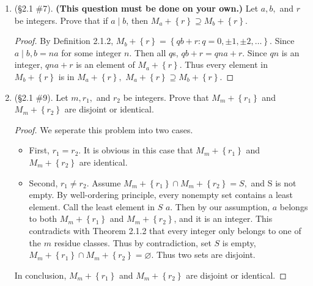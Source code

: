 \documentclass[11pt,a4paper]{article}
\begin{document}
\begin{enumerate}
	\item (\S 2.1 \#7).  \textbf{(This question must be done on your own.)} Let \(a, b,\) and \(r\) be integers. Prove that if \(a \mid b\), then \(M_{a}+\left\{ r\right\} \supseteq M_{b}+\left\{ r\right\}\).

	\begin{proof}
		By Definition 2.1.2, \(M_{b}+\left\{ r\right\} = \left\{ qb + r: q = 0, \pm 1, \pm 2, \ldots \right\}.\) Since $a \mid b, b = na$ for some integer $n.$ Then all $q$s, $qb+r = qna + r.$ Since $qn$ is an integer, $qna + r$ is an element of \(M_{a}+\left\{ r\right\}.\) Thus every element in \(M_{b}+\left\{ r\right\}\) is in \(M_{a}+\left\{ r\right\},\) \(M_{a}+\left\{ r\right\} \supseteq M_{b}+\left\{ r\right\}\).
	\end{proof}

	\item (\S 2.1 \#9). Let \(m, r_{1},\) and \(r_{2}\) be integers. Prove that \(M_{m}+\left\{r_{1}\right\}\) and \(M_{m}+\left\{r_{2}\right\}\) are disjoint or identical.

	\begin{proof} We seperate this problem into two cases.
		\begin{itemize}
			\item First, $r_1 = r_2.$ It is obvious in this case that \(M_{m}+\left\{r_{1}\right\}\) and \(M_{m}+\left\{r_{2}\right\}\) are identical.
			\item Second, $r_1 \ne r_2.$ Assume \(M_{m}+\left\{r_{1}\right\} \cap M_{m}+\left\{r_{2}\right\} = S,\) and S is not empty. By well-ordering principle, every nonempty set contains a least element. Call the least element in $S$ $a.$ Then by our assumption, $a$ belongs to both \(M_{m}+\left\{r_{1}\right\}\) and \(M_{m}+\left\{r_{2}\right\}\), and it is an integer. This contradicts with Theorem 2.1.2 that every integer only belongs to one of the $m$ residue classes. Thus by contradiction, set $S$ is empty, \(M_{m}+\left\{r_{1}\right\} \cap M_{m}+\left\{r_{2}\right\} = \varnothing.\) Thus two sets are disjoint.
		\end{itemize}
		In conclusion, \(M_{m}+\left\{r_{1}\right\}\) and \(M_{m}+\left\{r_{2}\right\}\) are disjoint or identical.
	\end{proof}






\end{enumerate}
\end{document}
